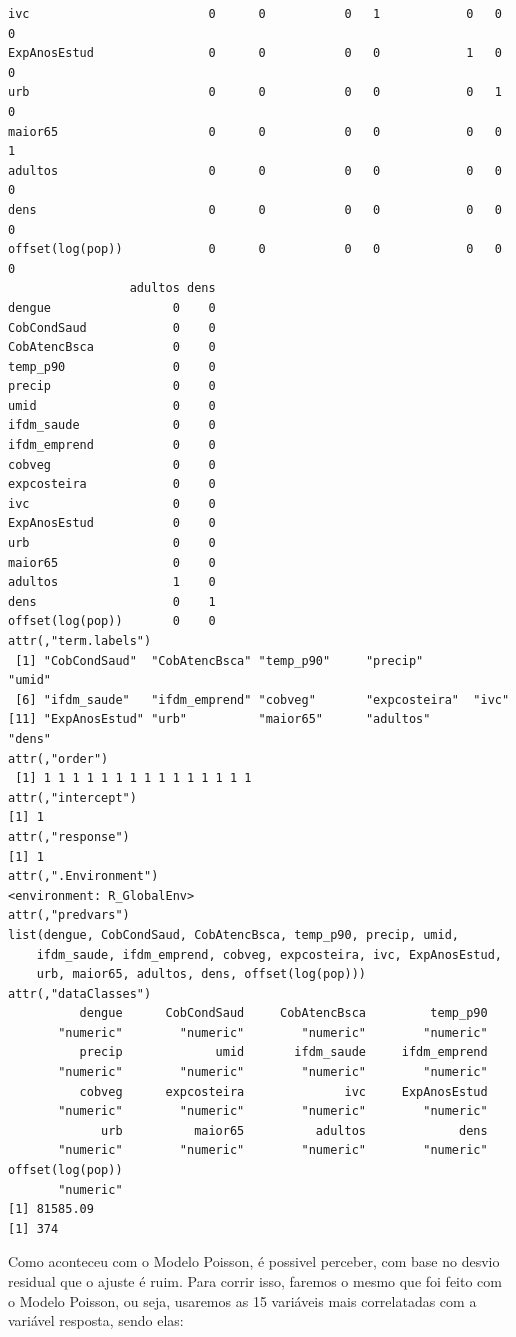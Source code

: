 \documentclass[12pt,a4paper]{article}\usepackage[]{graphicx}\usepackage[]{color}
\makeatletter
\newenvironment{kframe}{%
 \def\at@end@of@kframe{}%
 \ifinner\ifhmode%
  \def\at@end@of@kframe{\end{minipage}}%
  \begin{minipage}{\columnwidth}%
 \fi\fi%
 \def\FrameCommand##1{\hskip\@totalleftmargin \hskip-\fboxsep
 \colorbox{shadecolor}{##1}\hskip-\fboxsep
     \hskip-\linewidth \hskip-\@totalleftmargin \hskip\columnwidth}%
 \MakeFramed {\advance\hsize-\width
   \@totalleftmargin\z@ \linewidth\hsize
   \@setminipage}}%
 {\par\unskip\endMakeFramed%
 \at@end@of@kframe}
\newenvironment{knitrout}{}{} %
\makeatother
\begin{document}
\begin{knitrout}
\begin{kframe}
\begin{verbatim}
ivc                         0      0           0   1            0   0       0
ExpAnosEstud                0      0           0   0            1   0       0
urb                         0      0           0   0            0   1       0
maior65                     0      0           0   0            0   0       1
adultos                     0      0           0   0            0   0       0
dens                        0      0           0   0            0   0       0
offset(log(pop))            0      0           0   0            0   0       0
                 adultos dens
dengue                 0    0
CobCondSaud            0    0
CobAtencBsca           0    0
temp_p90               0    0
precip                 0    0
umid                   0    0
ifdm_saude             0    0
ifdm_emprend           0    0
cobveg                 0    0
expcosteira            0    0
ivc                    0    0
ExpAnosEstud           0    0
urb                    0    0
maior65                0    0
adultos                1    0
dens                   0    1
offset(log(pop))       0    0
attr(,"term.labels")
 [1] "CobCondSaud"  "CobAtencBsca" "temp_p90"     "precip"       "umid"        
 [6] "ifdm_saude"   "ifdm_emprend" "cobveg"       "expcosteira"  "ivc"         
[11] "ExpAnosEstud" "urb"          "maior65"      "adultos"      "dens"        
attr(,"order")
 [1] 1 1 1 1 1 1 1 1 1 1 1 1 1 1 1
attr(,"intercept")
[1] 1
attr(,"response")
[1] 1
attr(,".Environment")
<environment: R_GlobalEnv>
attr(,"predvars")
list(dengue, CobCondSaud, CobAtencBsca, temp_p90, precip, umid, 
    ifdm_saude, ifdm_emprend, cobveg, expcosteira, ivc, ExpAnosEstud, 
    urb, maior65, adultos, dens, offset(log(pop)))
attr(,"dataClasses")
          dengue      CobCondSaud     CobAtencBsca         temp_p90 
       "numeric"        "numeric"        "numeric"        "numeric" 
          precip             umid       ifdm_saude     ifdm_emprend 
       "numeric"        "numeric"        "numeric"        "numeric" 
          cobveg      expcosteira              ivc     ExpAnosEstud 
       "numeric"        "numeric"        "numeric"        "numeric" 
             urb          maior65          adultos             dens 
       "numeric"        "numeric"        "numeric"        "numeric" 
offset(log(pop)) 
       "numeric" 
[1] 81585.09
[1] 374
\end{verbatim}
\end{kframe}
\end{knitrout}
Como aconteceu com o Modelo Poisson, é possivel perceber, com base no desvio residual que o ajuste é ruim. Para corrir isso, faremos o mesmo que foi feito com o Modelo Poisson, ou seja, usaremos as 15 variáveis mais correlatadas com a variável resposta, sendo elas:
\end{document}

